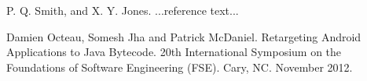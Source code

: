 \documentclass[preprint, cm]{sigplanconf}
\begin{document}




\begin{thebibliography}{}
\softraggedright

P. Q. Smith, and X. Y. Jones. ...reference text...

Damien Octeau, Somesh Jha and Patrick McDaniel. Retargeting 
Android Applications to Java Bytecode. 20th International 
Symposium on the Foundations of Software Engineering (FSE). Cary, NC. November 2012.

\end{thebibliography}
\end{document}
